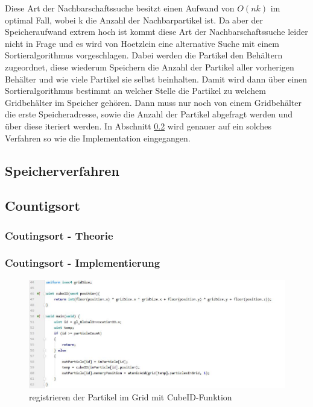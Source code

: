 \documentclass[intern,palatino]{cgBA}
\begin{document}
Diese Art der Nachbarschaftssuche besitzt einen Aufwand von $O(n k)$ im optimal Fall, wobei k die Anzahl der Nachbarpartikel ist. Da aber der Speicheraufwand extrem hoch ist kommt diese Art der Nachbarschaftssuche leider nicht in Frage und es wird von Hoetzlein \cite{nvidia} eine alternative Suche mit einem Sortieralgorithmus vorgeschlagen.
\newline
Dabei werden die Partikel den Behältern zugeordnet, diese wiederum Speichern die Anzahl der Partikel aller vorherigen Behälter und wie viele Partikel sie selbst beinhalten. Damit wird dann über einen Sortieralgorithmus bestimmt an welcher Stelle die Partikel zu welchem Gridbehälter im Speicher gehören. Dann muss nur noch von einem Gridbehälter die erste Speicheradresse, sowie die Anzahl der Partikel abgefragt werden und über diese iteriert werden.
\newline
In Abschnitt \ref{counting} wird genauer auf ein solches Verfahren so wie die Implementation eingegangen.


\subsection{Speicherverfahren}\label{speicher}

\subsection{Countigsort}\label{counting}



\subsubsection{Coutingsort - Theorie}

\subsubsection{Coutingsort - Implementierung}
\begin{figure}[H]
	\centering
	\includegraphics[width=1.3\columnwidth]{Bilder/lable.jpg}
	\caption{registrieren der Partikel im Grid mit CubeID-Funktion }
	\label{img:lable}
\end{figure}
\end{document}
